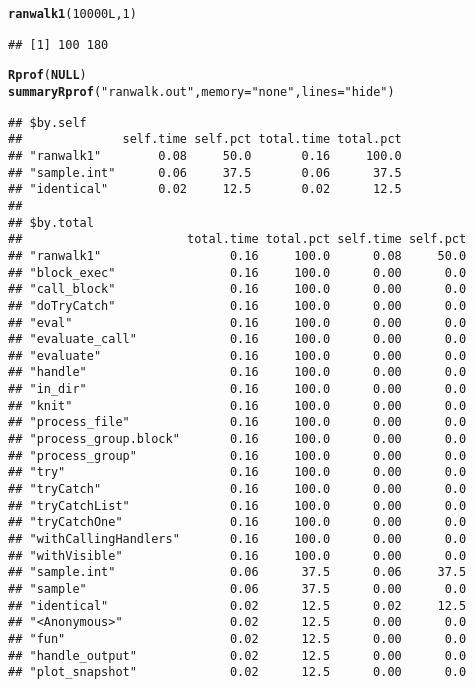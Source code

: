 \documentclass{article}\usepackage[]{graphicx}\usepackage[]{color}
\makeatletter
\newcommand{\hlnum}[1]{\textcolor[rgb]{0.686,0.059,0.569}{#1}}%
\newcommand{\hlstr}[1]{\textcolor[rgb]{0.192,0.494,0.8}{#1}}%
\newcommand{\hlstd}[1]{\textcolor[rgb]{0.345,0.345,0.345}{#1}}%
\newcommand{\hlkwa}[1]{\textcolor[rgb]{0.161,0.373,0.58}{\textbf{#1}}}%
\newcommand{\hlkwc}[1]{\textcolor[rgb]{0.333,0.667,0.333}{#1}}%
\newcommand{\hlkwd}[1]{\textcolor[rgb]{0.737,0.353,0.396}{\textbf{#1}}}%
\newenvironment{kframe}{%
 \def\at@end@of@kframe{}%
 \ifinner\ifhmode%
  \def\at@end@of@kframe{\end{minipage}}%
  \begin{minipage}{\columnwidth}%
 \fi\fi%
 \def\FrameCommand##1{\hskip\@totalleftmargin \hskip-\fboxsep
 \colorbox{shadecolor}{##1}\hskip-\fboxsep
     \hskip-\linewidth \hskip-\@totalleftmargin \hskip\columnwidth}%
 \MakeFramed {\advance\hsize-\width
   \@totalleftmargin\z@ \linewidth\hsize
   \@setminipage}}%
 {\par\unskip\endMakeFramed%
 \at@end@of@kframe}
\newenvironment{knitrout}{}{} %
\makeatother
\begin{document}
\begin{knitrout}
\begin{kframe}
\begin{alltt}
\hlkwd{ranwalk1}\hlstd{(}\hlnum{10000L}\hlstd{,} \hlnum{1}\hlstd{)}
\end{alltt}
\begin{verbatim}
## [1] 100 180
\end{verbatim}
\begin{alltt}
\hlkwd{Rprof}\hlstd{(}\hlkwa{NULL}\hlstd{)}
\hlkwd{summaryRprof}\hlstd{(}\hlstr{"ranwalk.out"}\hlstd{,} \hlkwc{memory} \hlstd{=} \hlstr{"none"}\hlstd{,} \hlkwc{lines} \hlstd{=} \hlstr{"hide"}\hlstd{)}
\end{alltt}
\begin{verbatim}
## $by.self
##              self.time self.pct total.time total.pct
## "ranwalk1"        0.08     50.0       0.16     100.0
## "sample.int"      0.06     37.5       0.06      37.5
## "identical"       0.02     12.5       0.02      12.5
## 
## $by.total
##                       total.time total.pct self.time self.pct
## "ranwalk1"                  0.16     100.0      0.08     50.0
## "block_exec"                0.16     100.0      0.00      0.0
## "call_block"                0.16     100.0      0.00      0.0
## "doTryCatch"                0.16     100.0      0.00      0.0
## "eval"                      0.16     100.0      0.00      0.0
## "evaluate_call"             0.16     100.0      0.00      0.0
## "evaluate"                  0.16     100.0      0.00      0.0
## "handle"                    0.16     100.0      0.00      0.0
## "in_dir"                    0.16     100.0      0.00      0.0
## "knit"                      0.16     100.0      0.00      0.0
## "process_file"              0.16     100.0      0.00      0.0
## "process_group.block"       0.16     100.0      0.00      0.0
## "process_group"             0.16     100.0      0.00      0.0
## "try"                       0.16     100.0      0.00      0.0
## "tryCatch"                  0.16     100.0      0.00      0.0
## "tryCatchList"              0.16     100.0      0.00      0.0
## "tryCatchOne"               0.16     100.0      0.00      0.0
## "withCallingHandlers"       0.16     100.0      0.00      0.0
## "withVisible"               0.16     100.0      0.00      0.0
## "sample.int"                0.06      37.5      0.06     37.5
## "sample"                    0.06      37.5      0.00      0.0
## "identical"                 0.02      12.5      0.02     12.5
## "<Anonymous>"               0.02      12.5      0.00      0.0
## "fun"                       0.02      12.5      0.00      0.0
## "handle_output"             0.02      12.5      0.00      0.0
## "plot_snapshot"             0.02      12.5      0.00      0.0

\end{verbatim}
\end{kframe}
\end{knitrout}
\end{document}
